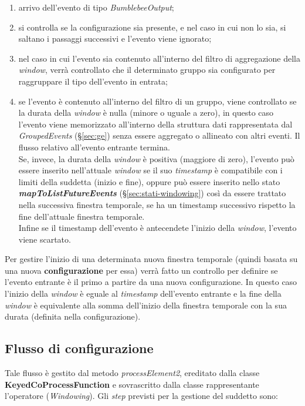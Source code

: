 \begin{enumerate}
	\item{arrivo dell'evento di tipo \textit{BumblebeeOutput};}
	\item{si controlla se la configurazione sia presente, e nel caso in cui non lo sia, si saltano i passaggi successivi e l'evento viene ignorato;}
	\item{nel caso in cui l'evento sia contenuto all'interno del filtro di aggregazione della \textit{window}, verrà controllato che il determinato gruppo sia configurato per raggruppare il tipo dell'evento in entrata;}
\item{se l'evento è contenuto all'interno del filtro di un gruppo, viene controllato se la durata della \textit{window} è nulla (minore o uguale a zero), in questo caso l'evento viene memorizzato all'interno della struttura dati rappresentata dal \textit{GroupedEvents} (\S\ref{sec:ge}) senza essere aggregato o allineato con altri eventi. Il flusso relativo all'evento entrante termina.\\
Se, invece, la durata della \textit{window} è positiva (maggiore di zero), l'evento può essere inserito nell'attuale \textit{window} se il suo \textit{\gls{timestamp}} è compatibile con i limiti della suddetta (inizio e fine), oppure può essere inserito nello stato \textbf{\textit{mapToListFutureEvents}} (\S\ref{sec:stati-windowing}) così da essere trattato nella successiva finestra temporale, se ha un \gls{timestamp} successivo rispetto la fine dell'attuale finestra temporale.\\
Infine se il \gls{timestamp} dell'evento è antecendete l'inizio della \textit{window}, l'evento viene scartato.}
\end{enumerate}

Per gestire l'inizio di una determinata nuova finestra temporale (quindi basata su una nuova \textbf{configurazione} per essa) verrà fatto un controllo per definire se l'evento entrante è il primo a partire da una nuova configurazione. In questo caso l'inizio della \textit{window} è eguale al \textit{\gls{timestamp}} dell'evento entrante e la fine della \textit{window} è equivalente alla somma dell'inizio della finestra temporale con la sua durata (definita nella configurazione).
\subsection{Flusso di configurazione}\label{sec:pr2-windowing}
Tale flusso è gestito dal metodo \textit{processElement2}, ereditato dalla classe \textbf{KeyedCoProcessFunction} e sovrascritto dalla classe rappresentante l'operatore (\textit{Windowing}). Gli \textit{step} previsti per la gestione del suddetto sono:

